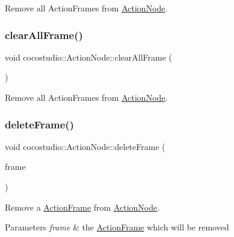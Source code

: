 Remove all Action\+Frames from \hyperlink{classcocostudio_1_1ActionNode}{Action\+Node}. \mbox{\label{classcocostudio_1_1ActionNode_aecb985671dc22f4e3beecadbd63badd9}} 
\subsubsection{\texorpdfstring{clear\+All\+Frame()}{clearAllFrame()}\hspace{0.1cm}{\footnotesize\ttfamily [2/2]}}
{\footnotesize\ttfamily void cocostudio\+::\+Action\+Node\+::clear\+All\+Frame (\begin{DoxyParamCaption}{ }\end{DoxyParamCaption})}

Remove all Action\+Frames from \hyperlink{classcocostudio_1_1ActionNode}{Action\+Node}. \mbox{\label{classcocostudio_1_1ActionNode_a5b671d485ec7f81f5012ca6d7fa73aa5}} 
\subsubsection{\texorpdfstring{delete\+Frame()}{deleteFrame()}\hspace{0.1cm}{\footnotesize\ttfamily [1/2]}}
{\footnotesize\ttfamily void cocostudio\+::\+Action\+Node\+::delete\+Frame (\begin{DoxyParamCaption}\item[{\hyperlink{classcocostudio_1_1ActionFrame}{Action\+Frame} $\ast$}]{frame }\end{DoxyParamCaption})}

Remove a \hyperlink{classcocostudio_1_1ActionFrame}{Action\+Frame} from \hyperlink{classcocostudio_1_1ActionNode}{Action\+Node}.


\begin{DoxyParams}{Parameters}
{\em frame} & the \hyperlink{classcocostudio_1_1ActionFrame}{Action\+Frame} which will be removed \\
\hline
\end{DoxyParams}
\mbox{\label{classcocostudio_1_1ActionNode_a5b671d485ec7f81f5012ca6d7fa73aa5}} 
